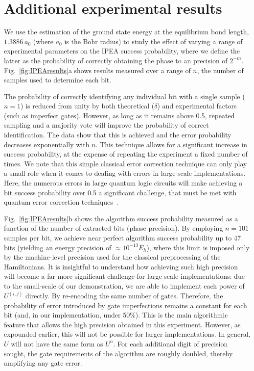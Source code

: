 \documentclass[11pt,oneside,final]{huthesis}%
\begin{document}
\section{Additional experimental results}\label{sec:extraexpt}
We use the estimation of the ground state energy at the equilibrium bond length, $1.3886~a_0$ 
(where $a_0$ is the Bohr radius) to study the effect of varying a range of experimental 
parameters on the IPEA success probability, where we define the latter as the probability of 
correctly obtaining the phase to an precision of $2^{-m}$. Fig.~\ref{fig:IPEAresults}a shows 
results measured over a range of $n$, the number of samples used to determine each bit.

The probability of correctly identifying any individual bit with a single sample ($n=1$) is reduced 
from unity by both theoretical ($\delta$) and experimental factors (such as imperfect gates). 
However, as long as it remains above 0.5, repeated sampling and a majority vote will improve 
the probability of correct identification. The data show that this is achieved and the error
probability decreases exponentially with $n$. This technique allows for a significant increase in success probability, at the 
expense of repeating the experiment a fixed number of times. We note that this simple classical 
error correction technique can only play a small role when it comes to dealing with errors in 
large-scale implementations. Here, the numerous errors in large quantum logic circuits will 
make achieving a bit success probability over  0.5 a significant challenge, that must be met with 
quantum error correction techniques~\cite{Nielsen00,Clark09}.

Fig.~\ref{fig:IPEAresults}b shows the algorithm success probability measured as a function of the 
number of
extracted bits (phase precision). By employing $n=101$ samples per bit, we achieve near 
perfect
algorithm success probability up to 47 bits (yielding an energy precision of
$\approx 10^{-13}E_{h}$), where this limit is imposed only by the
machine-level precision used for the classical preprocessing of the
Hamiltonians. It is insightful to understand how achieving such high precision
will become a far more significant challenge for  large-scale implementations:
due to the small-scale of our demonstration, we are able to implement each power
of ${U}^{(i,j)}$ directly. By re-encoding the same number of gates.
Therefore, the probability of error introduced by gate imperfections remains a
constant for each bit (and, in our implementation, under 50\%). This is the main
algorithmic feature that allows the high precision obtained in this experiment.
However, as expounded earlier, this will not be possible for
larger implementations. In general, ${U}$ will not have the same form as
${U}^n$. For each additional digit of precision sought, the gate
requirements of the algorithm are roughly doubled, thereby amplifying any gate error. 
\end{document}
